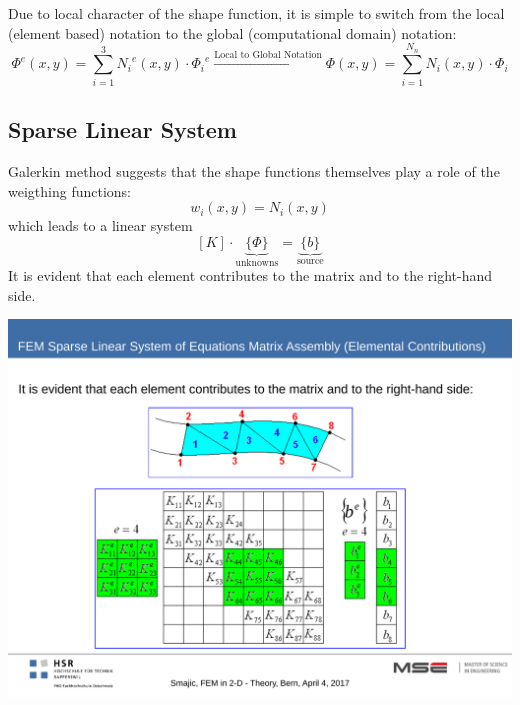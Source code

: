 Due to local character of the shape function, it is simple to switch from the local (element based) notation to the global (computational domain) notation:
\begin{equation*}
	\Phi^e(x,y) = \sum_{i=1}^{3}{N_i}^e(x,y) \cdot {\Phi_i}^e \xrightarrow{\textrm{Local to Global Notation}} \Phi(x,y) = \sum_{i=1}^{N_n} N_i(x,y) \cdot \Phi_i
\end{equation*}

\subsection{Sparse Linear System}
\begin{minipage}[lt]{13cm}
	Galerkin method suggests that the shape functions themselves play a role of the weigthing functions: 
	\begin{equation*}
		w_i(x,y) = N_i(x,y)
	\end{equation*}
	which leads to a linear system 
	\begin{equation*}	
		\left[K\right] \cdot \underbrace{\{\Phi\}}_{\textrm{unknowns}} = \underbrace{\{b\}}_{\textrm{source}}
	\end{equation*}
	It is evident that each element contributes to the matrix and to the right-hand side. 
\end{minipage}
\begin{minipage}[rt]{7cm}
	\begin{centering}
		\includegraphics[width=.85\textwidth]{./images/sparse.pdf}
	\end{centering}
\end{minipage}

